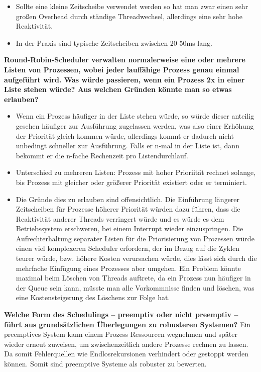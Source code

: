 \documentclass[a4paper]{article}
\begin{document}
\begin{itemize*}
\begin{itemize}
        \item Sollte eine kleine Zeitscheibe verwendet werden so hat man zwar einen sehr großen Overhead durch ständige Threadwechsel, allerdings eine sehr hohe Reaktivität.
        \item In der Praxis sind typische Zeitscheiben zwischen 20-50ms lang.
    \end{itemize}
    \item \textbf{Round-Robin-Scheduler verwalten normalerweise eine oder mehrere Listen von Prozessen, wobei jeder lauffähige Prozess genau einmal aufgeführt wird. Was würde passieren, wenn ein Prozess 2x in einer Liste stehen würde? Aus welchen Gründen könnte man so etwas erlauben?}
    \begin{itemize}
        \item Wenn ein Prozess häufiger in der Liste stehen würde, so würde dieser anteilig gesehen häufiger zur Ausführung zugelassen werden, was also einer Erhöhung der Priorität gleich kommen würde, allerdings kommt er dadurch nicht unbedingt schneller zur Ausführung. Falls er n-mal in der Liste ist, dann bekommt er die n-fache Rechenzeit pro Listendurchlauf.
        \item Unterschied zu mehreren Listen: Prozess mit hoher Prioriität rechnet solange, bis Prozess mit gleicher oder größerer Priorität existiert oder er terminiert.
        \item Die Gründe dies zu erlauben sind offensichtlich. Die Einführung längerer Zeitscheiben für Prozesse höherer Priorität würden dazu führen, dass die Reaktivität anderer Threads verringert würde und es würde es dem Betriebssystem erschweren, bei einem Interrupt wieder einzuspringen. Die Aufrechterhaltung separater Listen für die Priorisierung von Prozessen würde einen viel komplexeren Scheduler erfordern, der im Bezug auf die Zyklen teurer würde, bzw. höhere Kosten verursachen würde, dies lässt sich durch die mehrfache Einfügung eines Prozesses aber umgehen.
              Ein Problem könnte maximal beim Löschen von Threads auftrete, da ein Prozess nun häufiger in der Queue sein kann, müsste man alle Vorkommnisse finden und löschen, was eine Kostensteigerung des Löschens zur Folge hat.
    \end{itemize}
    \item \textbf{Welche Form des Schedulings – preemptiv oder nicht preemptiv – führt aus grundsätzlichen Überlegungen zu robusteren Systemen?} Ein preemptives System kann einem Prozess Ressourcen wegnehmen und später wieder erneut zuweisen, um zwischenzeitlich andere Prozesse rechnen zu lassen. Da somit Fehlerquellen wie Endlosrekursionen verhindert oder gestoppt werden können. Somit sind preemptive Systeme als robuster zu bewerten.
\end{itemize*}
\end{document}
